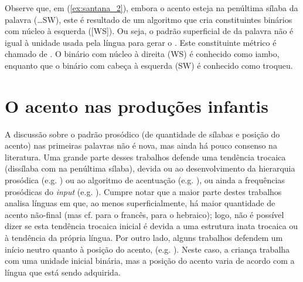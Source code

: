 \documentclass[output=paper]{LSP/langsci}
\begin{document}
Observe que, em (\ref{ex:santana_2}), embora o acento esteja na penúltima sílaba da palavra (\ldots SW), este é resultado de um algoritmo que cria constituintes binários com núcleo à esquerda ([WS]). Ou seja, o padrão superficial de  da palavra não é igual à unidade usada pela língua para gerar o . Este constituinte métrico é chamado de . O  binário com núcleo à direita (WS) é conhecido como iambo, enquanto que o  binário com cabeça à esquerda (SW) é conhecido como troqueu.

\section{O acento nas produções infantis}
\label{sec:santana_producoes_infantis}

A discussão sobre o padrão prosódico (de quantidade de sílabas e posição do acento) nas primeiras palavras não é nova, mas ainda há pouco consenso na literatura. Uma grande parte desses trabalhos defende uma tendência trocaica (dissílaba com  na penúltima sílaba), devida ou ao desenvolvimento da hierarquia prosódica (e.g. \citealt{demuth1996}) ou ao algoritmo de acentuação (e.g. \citealt{fikkert1994}), ou ainda a frequências prosódicas do \textit{input} (e.g. \citealt{prieto2006}). Cumpre notar que a maior parte destes trabalhos analisa línguas em que, ao menos superficialmente, há maior quantidade de acento não-final (mas cf. \citealt{demuth1996} para o francês, \citealt{adambatel2008} para o hebraico); logo, não é possível dizer se esta tendência trocaica inicial é devida a uma estrutura inata trocaica ou à tendência da própria língua. Por outro lado, alguns trabalhos defendem um início neutro quanto à posição do acento, (e.g. \citealt{hochberg1988,vihman_etal1998,rosechamodoizeau}). Neste caso, a criança trabalha com uma unidade inicial binária, mas a posição do acento varia de acordo com a língua que está sendo adquirida.
\end{document}
